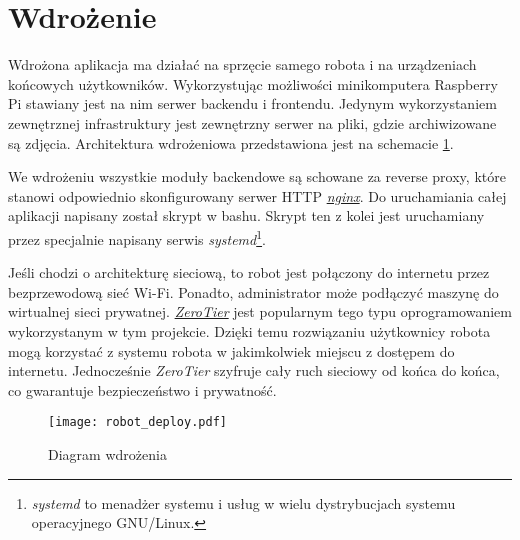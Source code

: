 \section{Wdrożenie}
Wdrożona aplikacja ma działać na sprzęcie samego robota i na urządzeniach końcowych użytkowników.
Wykorzystując możliwości minikomputera Raspberry Pi stawiany jest na nim serwer backendu i frontendu.
Jedynym wykorzystaniem zewnętrznej infrastruktury jest zewnętrzny serwer na pliki, gdzie archiwizowane są zdjęcia.
Architektura wdrożeniowa przedstawiona jest na schemacie \ref{rys:deploy}.

We wdrożeniu wszystkie moduły backendowe są schowane za reverse proxy, które stanowi odpowiednio skonfigurowany serwer HTTP \href{https://nginx.org/}{\textit{nginx}}.
Do uruchamiania całej aplikacji napisany został skrypt w bashu.
Skrypt ten z kolei jest uruchamiany przez specjalnie napisany serwis \textit{systemd}\footnote{\textit{systemd} to menadżer systemu i usług w wielu dystrybucjach systemu operacyjnego GNU/Linux.}.

Jeśli chodzi o architekturę sieciową, to robot jest połączony do internetu przez bezprzewodową sieć Wi-Fi.
Ponadto, administrator może podłączyć maszynę do wirtualnej sieci prywatnej.
\href{https://www.zerotier.com/}{\textit{ZeroTier}} jest popularnym tego typu oprogramowaniem wykorzystanym w tym projekcie.
Dzięki temu rozwiązaniu użytkownicy robota mogą korzystać z systemu robota w jakimkolwiek miejscu z dostępem do internetu.
Jednocześnie \textit{ZeroTier} szyfruje cały ruch sieciowy od końca do końca, co gwarantuje bezpieczeństwo i prywatność.
\begin{figure}[!hb]
    \centering \texttt{[image: robot\_deploy.pdf]}
    \caption{Diagram wdrożenia}
    \label{rys:deploy}
\end{figure}


